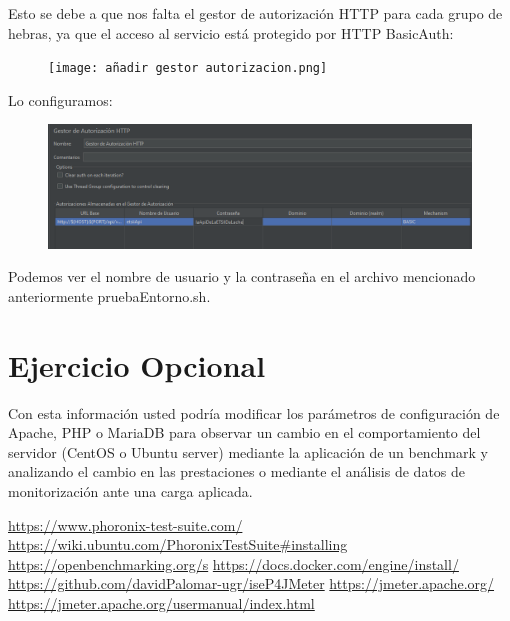 \documentclass[a4paper]{article}
\begin{document}
\newpage Esto se debe a que nos falta el gestor de autorización HTTP para 
cada grupo de hebras, ya que el acceso al servicio está protegido por HTTP BasicAuth:
\begin{figure}[hbt!]
    \texttt{[image: añadir gestor autorizacion.png]}
\end{figure}
\newline Lo configuramos: 
\begin{figure}[hbt!]
    \includegraphics[width=\textwidth]{gestor autorizacion configurado.png}
\end{figure}
\newpage
Podemos ver el nombre de usuario y la contraseña en el archivo mencionado anteriormente
pruebaEntorno.sh.
\section{Ejercicio Opcional}
Con esta información usted podría modificar los parámetros
de configuración de Apache, PHP o MariaDB para observar un cambio en el
comportamiento del servidor (CentOS o Ubuntu server) mediante la aplicación
de un benchmark y analizando el cambio en las prestaciones o mediante el análisis
de datos de monitorización ante una carga aplicada.

\newpage
\begin{thebibliography}{99}
    \href{https://www.phoronix-test-suite.com/}{https://www.phoronix-test-suite.com/}
    \href{https://wiki.ubuntu.com/PhoronixTestSuite#installing}{https://wiki.ubuntu.com/PhoronixTestSuite\#installing}
    \href{https://openbenchmarking.org/s}{https://openbenchmarking.org/s}
    \href{https://docs.docker.com/engine/install/}{https://docs.docker.com/engine/install/}
    \href{https://github.com/davidPalomar-ugr/iseP4JMeter}{https://github.com/davidPalomar-ugr/iseP4JMeter}
    \href{https://jmeter.apache.org/}{https://jmeter.apache.org/}
    \href{https://jmeter.apache.org/usermanual/index.html}{https://jmeter.apache.org/usermanual/index.html}
\end{thebibliography}
\end{document}

